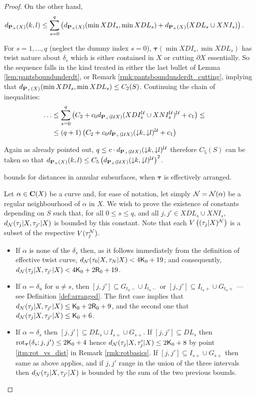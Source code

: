 \begin{proof}
On the other hand,
\begin{eqnarray*}
 & d_{{\mathbf{P}_+}(X)}(k, l) \leq \sum_{s=0}^q \left(d_{{\mathbf{P}_+}(X)}(\min XDI_s,\min XDL_s) + d_{{\mathbf{P}_+}(X)}(XDL_s\cup XNI_s) \right). & 
\end{eqnarray*}

For $s=1,\ldots, q$ (neglect the dummy index $s=0$), $\bm\tau(\min XDI_s,\min XDL_s)$ has twist nature about $\delta_s$ which is either contained in $X$ or cutting $\partial X$ essentially. So the sequence falls in the kind treated in either the last bullet of Lemma \ref{lem:pantsboundunderdt}, or Remark \ref{rmk:pantsboundunderdt_cutting}, implying that $d_{{\mathbf{P}_+}(X)}(\min XDI_s,\min XDL_s)\leq C_2(S)$. Continuing the chain of inequalities:
\begin{eqnarray*}
\ldots & \leq \sum_{s=0}^q \left(C_2 + c_0 d_{{\mathbf{P}_+}({\mathcal U} X)}(XDI_s^{\mathcal U}\cup XNI_s^{\mathcal U})^{\mathcal U} +c_1\right) \leq & \\
 & \leq (q+1)\left(C_2+c_0 d_{{\mathbf{P}_+}({\mathcal U} X)}(\mathord{\downarrow} k,\mathord{\downarrow} l)^{\mathcal U} + c_1\right) & 
\end{eqnarray*}

Again as already pointed out, $q\leq c \cdot d_{{\mathbf{P}_+}({\mathcal U} X)}(\mathord{\downarrow} k,\mathord{\downarrow} l)^{\mathcal U}$ therefore $C_5(S)$ can be taken so that $d_{{\mathbf{P}_+}(X)}(k,l)\leq C_5 \left(d_{{\mathbf{P}_+}({\mathcal U} X)}(\mathord{\downarrow} k,\mathord{\downarrow} l)^{\mathcal U}\right)^2$.

 bounds for distances in annular subsurfaces, when $\bm\tau$ is effectively arranged.

Let $\alpha\in \mathbf C(X)$ be a curve and, for ease of notation, let simply ${\mathcal N}={\mathcal N}(\alpha)$ be a regular neighbourhood of $\alpha$ in $X$. We wish to prove the existence of constants depending on $S$ such that, for all $0\leq s\leq q$, and all $j,j'\in XDL_s\cup XNI_s$, $d_{\mathcal N}(\tau_j|X,\tau_{j'}|X)$ is bounded by this constant. Note that each $V\left((\tau_j|X)^{\mathcal N}\right)$ is a subset of the respective $V(\tau_j^{\mathcal N})$.

\begin{itemize}
\item If $\alpha$ is none of the $\delta_s$ then, as it follows immediately from the definition of effective twist curve, $d_{\mathcal N}(\tau_0|X,\tau_N|X)< 4\mathsf{K}_0+19$; and consequently, $d_{\mathcal N}(\tau_j|X,\tau_{j'}|X)< 4\mathsf{K}_0+2\mathsf{R}_0+19$.
\item If $\alpha=\delta_u$ for $u\not=s$, then $[j,j']\subseteq G_{t_u-}\cup I_{t_u-}$ or $[j,j']\subseteq I_{t_u+}\cup G_{t_u+}$ --- see Definition \ref{def:arranged}. The first case implies that $d_{\mathcal N}(\tau_j|X,\tau_{j'}|X)\leq \mathsf{\mathsf{K}_0}+2\mathsf{R}_0+9$, and the second one that $d_{\mathcal N}(\tau_j|X,\tau_{j'}|X)\leq \mathsf{K}_0+6$.
\item If $\alpha=\delta_s$ then $[j,j']\subseteq DL_s\cup I_{s+}\cup G_{s+}$. If $[j,j']\subseteq DL_s$ then $\mathrm{rot}_{\bm\tau}(\delta_s;j,j')\leq 2\mathsf{K}_0+4$ hence $d_{\mathcal N}(\tau_j|X,\tau_j'|X)\leq 2\mathsf{K}_0+8$ by point \ref{itm:rot_vs_dist} in Remark \ref{rmk:rotbasics}. If $[j,j']\subseteq I_{s+}\cup G_{s+}$ then same as above applies, and if $j,j'$ range in the union of the three intervals then $d_{\mathcal N}(\tau_j|X,\tau_{j'}|X)$ is bounded by the sum of the two previous bounds.
\end{itemize}


\end{proof}
